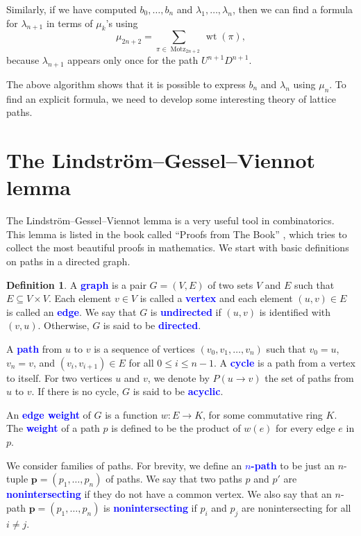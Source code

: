 \documentclass[oneside]{book}
\numberwithin{equation}{section}
\theoremstyle{definition}
\newtheorem{defn}[thm]{Definition}
\newcommand\Motz{\operatorname{Motz}}
\newcommand\wt{\operatorname{wt}}
\renewcommand\vec[1]{\mathbf{#1}}
\renewcommand\emph[1]{\textcolor{blue}{\bf #1}}
\begin{document}
Similarly, if we have computed \( b_0,\dots,b_{n} \) and
\( \lambda_1,\dots,\lambda_n \), then we can find a formula for
\( \lambda_{n+1} \) in terms of \( \mu_k \)'s using
\[
  \mu_{2n+2} = \sum_{\pi\in \Motz_{2n+2}} \wt(\pi),
\]
because \( \lambda_{n+1} \) appears only once for the path
\( U^{n+1}D^{n+1} \).

The above algorithm shows that it is possible to express \( b_n \) and
\( \lambda_n \) using \( \mu_n \). To find an explicit formula, we
need to develop some interesting theory of lattice paths.


\section{The Lindstr\"om--Gessel--Viennot lemma}

The Lindstr\"om--Gessel--Viennot lemma \cite{Lindstrom,GesselViennot}
is a very useful tool in combinatorics. This lemma is listed in the
book called ``Proofs from The Book'' \cite[Chapter~32]{Aigner2018},
which tries to collect the most beautiful proofs in mathematics. We
start with basic definitions on paths in a directed graph.


\begin{defn}\label{def:5}
  A \emph{graph} is a pair \( G= (V,E) \) of two sets \( V \) and
  \( E \) such that \( E\subseteq V\times V \). Each element
  \( v\in V \) is called a \emph{vertex} and each element
  \( (u,v)\in E \) is called an \emph{edge}. We say that \( G \) is
  \emph{undirected} if \( (u,v) \) is identified with \( (v,u) \).
  Otherwise, \( G \) is said to be \emph{directed}.

  A \emph{path} from \( u \) to \( v \) is a sequence of vertices
  \( (v_0,v_1,\dots,v_n) \) such that \( v_0=u \), \( v_n=v \), and
  \( (v_i,v_{i+1})\in E \) for all \( 0\le i\le n-1 \). A \emph{cycle}
  is a path from a vertex to itself. For two vertices \( u \) and
  \( v \), we denote by \( P(u\to v) \) the set of paths from \( u \)
  to \( v \). If there is no cycle, \( G \) is said to be
  \emph{acyclic}. 

  An \emph{edge weight} of \( G \) is a function \( w:E \to K \), for
  some commutative ring \( K \). The \emph{weight} of a path \( p \)
  is defined to be the product of \( w(e) \) for every edge \( e \) in
  \( p \).
\end{defn}


We consider families of paths. For brevity, we define an
\emph{\( n \)-path} to be just an \( n \)-tuple
\( \vec p = (p_1,\dots,p_n) \) of paths. We say that two paths \( p \)
and \( p' \) are \emph{nonintersecting} if they do not have a common
vertex. We also say that an \( n \)-path
\( \vec p = (p_1,\dots,p_n) \) is \emph{nonintersecting} if \( p_i \)
and \( p_j \) are nonintersecting for all \( i\ne j \).
\end{document}

